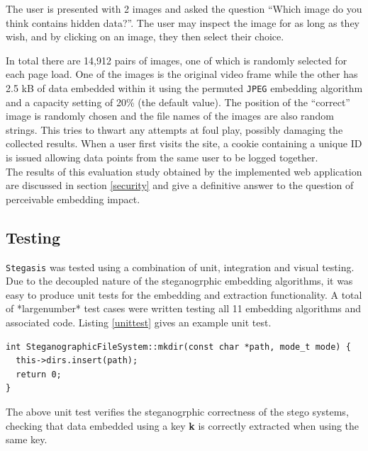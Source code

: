 \documentclass[paper=a4, fontsize=11pt,twoside]{scrartcl}    %
\numberwithin{table}{section}
\numberwithin{figure}{section}
\numberwithin{algorithm}{section}
\begin{document}
The user is presented with 2 images and asked the question ``Which image do you think contains hidden data?''. The user may inspect the image for as long as they wish, and by clicking on an image, they then select their choice.

In total there are 14,912 pairs of images, one of which is randomly selected for each page load. One of the images is the original video frame while the other has 2.5 kB of data embedded within it using the permuted \texttt{JPEG} embedding algorithm and a capacity setting of 20\% (the default value). The position of the ``correct'' image is randomly chosen and the file names of the images are also random strings. This tries to thwart any attempts at foul play, possibly damaging the collected results. When a user first visits the site, a cookie containing a unique ID is issued allowing data points from the same user to be logged together.\\

\noindent
The results of this evaluation study obtained by the implemented web application are discussed in section \ref{security} and give a definitive answer to the question of perceivable embedding impact.

\subsection{Testing}
\label{testing}

\texttt{Stegasis} was tested using a combination of unit, integration and visual testing. Due to the decoupled nature of the steganogrphic embedding algorithms, it was easy to produce unit tests for the embedding and extraction functionality. A total of *largenumber* test cases were written testing all 11 embedding algorithms and associated code. Listing \ref{unittest} gives an example unit test.

\begin{lstlisting}[caption={Embedding algorithm unit test (\texttt{steg/steg\_algorithm\_test.cc:100}).}, frame=single, label=unittest]
int SteganographicFileSystem::mkdir(const char *path, mode_t mode) {
  this->dirs.insert(path);
  return 0;
}
\end{lstlisting}

The above unit test verifies the steganogrphic correctness of the stego systems, checking that data embedded using a key \textbf{k} is correctly extracted when using the same key.
\end{document}
